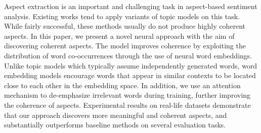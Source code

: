 Aspect extraction is an important and challenging task in aspect-based sentiment analysis. Existing works tend to apply variants of topic models on this task. While fairly successful, these methods usually do not produce highly coherent aspects. In this paper, we present a novel neural approach with the aim of discovering coherent aspects. The model improves coherence by exploiting the distribution of word co-occurrences through the use of neural word embeddings. Unlike topic models which typically assume independently generated words, word embedding models encourage words that appear in similar contexts to be located close to each other in the embedding space. In addition, we use an attention mechanism to de-emphasize irrelevant words during training, further improving the coherence of aspects. Experimental results on real-life datasets demonstrate that our approach discovers more meaningful and coherent aspects, and substantially outperforms baseline methods on several evaluation tasks.
